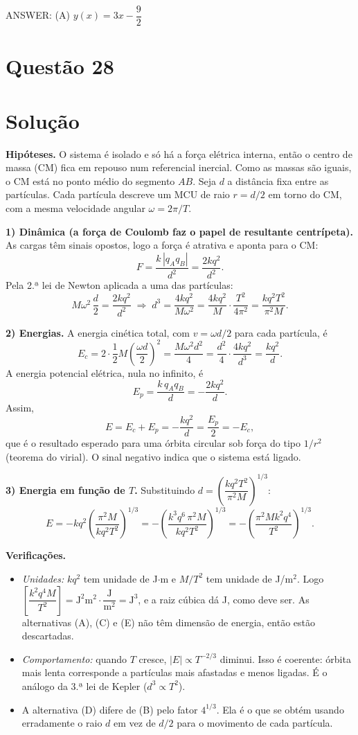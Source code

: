 \documentclass{article}%
\begin{document}
ANSWER: (A) $y(x)=3x-\dfrac{9}{2}$%
\newpage%
\section*{Questão 28}

\section*{Solução}

\textbf{Hipóteses.} O sistema é isolado e só há a força elétrica interna, então o centro de massa (CM) fica em repouso num referencial inercial. Como as massas são iguais, o CM está no ponto médio do segmento $AB$. Seja $d$ a distância fixa entre as partículas. Cada partícula descreve um MCU de raio $r=d/2$ em torno do CM, com a mesma velocidade angular $\omega = 2\pi/T$.

\textbf{1) Dinâmica (a força de Coulomb faz o papel de resultante centrípeta).} As cargas têm sinais opostos, logo a força é atrativa e aponta para o CM:
\[
F=\frac{k\,|q_A q_B|}{d^2}=\frac{2kq^2}{d^2}.
\]
Pela 2.ª lei de Newton aplicada a uma das partículas:
\[
M\omega^2\,\frac{d}{2}=\frac{2kq^2}{d^2}
\;\Longrightarrow\;
d^3=\frac{4kq^2}{M\omega^2}=\frac{4kq^2}{M}\cdot\frac{T^2}{4\pi^2}=\frac{kq^2T^2}{\pi^2 M}.
\]

\textbf{2) Energias.} A energia cinética total, com $v=\omega d/2$ para cada partícula, é
\[
E_c=2\cdot\frac{1}{2}M\left(\frac{\omega d}{2}\right)^2=\frac{M\omega^2 d^2}{4}
=\frac{d^2}{4}\cdot\frac{4kq^2}{d^3}=\frac{kq^2}{d}.
\]
A energia potencial elétrica, nula no infinito, é
\[
E_p=\frac{k\,q_A q_B}{d}=-\frac{2kq^2}{d}.
\]
Assim,
\[
E=E_c+E_p=-\frac{kq^2}{d}=\frac{E_p}{2}=-E_c ,
\]
que é o resultado esperado para uma órbita circular sob força do tipo $1/r^2$ (teorema do virial). O sinal negativo indica que o sistema está ligado.

\textbf{3) Energia em função de $T$.} Substituindo $d=\left(\dfrac{kq^2T^2}{\pi^2M}\right)^{1/3}$:
\[
E=-kq^2\left(\frac{\pi^2 M}{kq^2T^2}\right)^{1/3}
=-\left(\frac{k^3q^6\,\pi^2 M}{kq^2T^2}\right)^{1/3}
=-\left(\frac{\pi^2 M k^2 q^4}{T^2}\right)^{1/3}.
\]

\textbf{Verificações.}
\begin{itemize}
\item \emph{Unidades:} $kq^2$ tem unidade de J$\cdot$m e $M/T^2$ tem unidade de J/m$^2$. Logo $\left[\dfrac{k^2q^4M}{T^2}\right]=\text{J}^2\text{m}^2\cdot\dfrac{\text{J}}{\text{m}^2}=\text{J}^3$, e a raiz cúbica dá J, como deve ser. As alternativas (A), (C) e (E) não têm dimensão de energia, então estão descartadas.
\item \emph{Comportamento:} quando $T$ cresce, $|E|\propto T^{-2/3}$ diminui. Isso é coerente: órbita mais lenta corresponde a partículas mais afastadas e menos ligadas. É o análogo da 3.ª lei de Kepler ($d^3\propto T^2$).
\item A alternativa (D) difere de (B) pelo fator $4^{1/3}$. Ela é o que se obtém usando erradamente o raio $d$ em vez de $d/2$ para o movimento de cada partícula.
\end{itemize}
\end{document}
